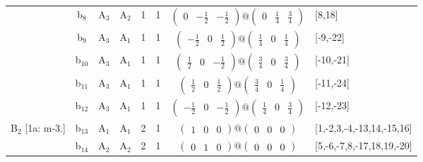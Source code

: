 \documentclass[fleqn,10pt,landscape]{article}
\begin{document}
\begin{itemize}
\begin{center}
\begin{longtable}{cc|cc|c|c|c|l}
& b$_{8}$ & A$_{3}$ & A$_{2}$ & 1 & 1 & $\begin{pmatrix} 0 & - \frac{1}{2} & - \frac{1}{2} \end{pmatrix}@\begin{pmatrix} 0 & \frac{1}{4} & \frac{3}{4} \end{pmatrix}$ & [8,18] \\
& b$_{9}$ & A$_{3}$ & A$_{1}$ & 1 & 1 & $\begin{pmatrix} - \frac{1}{2} & 0 & \frac{1}{2} \end{pmatrix}@\begin{pmatrix} \frac{1}{4} & 0 & \frac{1}{4} \end{pmatrix}$ & [-9,-22] \\
& b$_{10}$ & A$_{3}$ & A$_{1}$ & 1 & 1 & $\begin{pmatrix} \frac{1}{2} & 0 & - \frac{1}{2} \end{pmatrix}@\begin{pmatrix} \frac{3}{4} & 0 & \frac{3}{4} \end{pmatrix}$ & [-10,-21] \\
& b$_{11}$ & A$_{3}$ & A$_{1}$ & 1 & 1 & $\begin{pmatrix} \frac{1}{2} & 0 & \frac{1}{2} \end{pmatrix}@\begin{pmatrix} \frac{3}{4} & 0 & \frac{1}{4} \end{pmatrix}$ & [-11,-24] \\
& b$_{12}$ & A$_{3}$ & A$_{1}$ & 1 & 1 & $\begin{pmatrix} - \frac{1}{2} & 0 & - \frac{1}{2} \end{pmatrix}@\begin{pmatrix} \frac{1}{4} & 0 & \frac{3}{4} \end{pmatrix}$ & [-12,-23] \\ \hline
B$_{2}$ [1a: m-3.] & b$_{13}$ & A$_{1}$ & A$_{1}$ & 2 & 1 & $\begin{pmatrix} 1 & 0 & 0 \end{pmatrix}@\begin{pmatrix} 0 & 0 & 0 \end{pmatrix}$ & [1,-2,3,-4,-13,14,-15,16] \\
& b$_{14}$ & A$_{2}$ & A$_{2}$ & 2 & 1 & $\begin{pmatrix} 0 & 1 & 0 \end{pmatrix}@\begin{pmatrix} 0 & 0 & 0 \end{pmatrix}$ & [5,-6,-7,8,-17,18,19,-20] \\

\end{longtable}
\end{center}
\end{itemize}
\end{document}
